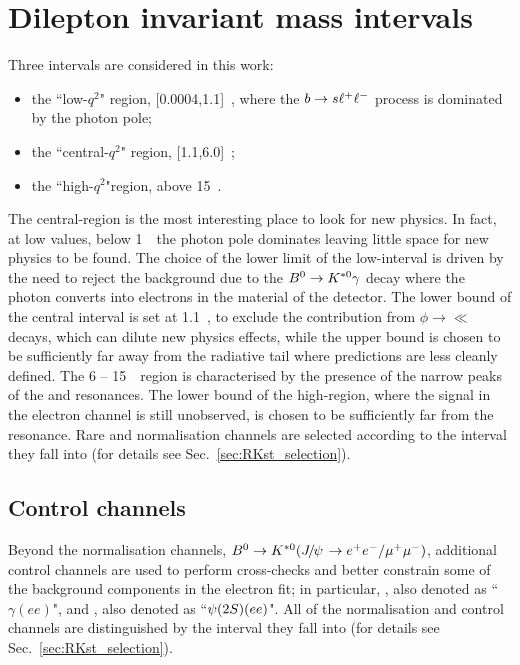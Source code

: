 \section{Dilepton invariant mass intervals}
\label{sec:RKst_q2_choice}

Three \qsq intervals are considered in this work: 
\begin{itemize}
\item the ``low-$q^2$" region, [0.0004,1.1]~\gevgevcccc, where the ${b}\rightarrow{\ensuremath{s}}\ell^+ \ell^-$ process is dominated by the photon pole;
\item the ``central-$q^2$" region, [1.1,6.0]~\gevgevcccc;
\item the ``high-$q^2$"region, above 15~\gevgevcccc.
\end{itemize}
%
The central-\qsq region is the most interesting place to look for new physics. In fact, at low \qsq values, below 
1~\gevgevcccc~the photon pole dominates leaving little space for new physics to be found. %
The choice of the lower limit of the low-\qsq interval is driven by the need to reject the background due to the 
${{B}^0}\rightarrow{\ensuremath{{K}^{*0}}}\gamma$ decay where the photon converts into electrons in the material of the detector.
The lower bound of the central interval is set at 1.1~\gevgevcccc, to exclude the contribution from $\phi\to\ll$ decays, 
which can dilute new physics effects, while the upper bound is chosen to be sufficiently far away from the \jpsi radiative
tail where predictions are less cleanly defined. The 6 -- 15~\gevgevcccc~region is characterised by the presence
of the narrow peaks of the \jpsi and \psitwos resonances. The lower bound of the high-\qsq region, where
the signal in the electron channel is still unobserved, is chosen to be sufficiently far from the \psitwos resonance.
Rare and normalisation channels are selected according to the \qsq interval they fall into (for details see Sec.~\ref{sec:RKst_selection}).

\subsection{Control channels}
Beyond the normalisation channels, $\Bz\to\Kstarz(\jpsi\to\ee/\mumu)$, additional control channels
are used to perform cross-checks and better constrain some of the background components
in the electron fit; in particular, \BdToKstGee, also denoted
as ``$\gamma (ee)$", and \BdToKstPsiee, also denoted as ``$\psitwos(ee)$".
All of the normalisation and control channels are distinguished by the \qsq interval
they fall into (for details see Sec.~\ref{sec:RKst_selection}).

